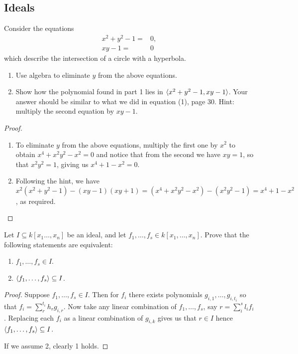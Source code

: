 \subsection{Ideals}


\begin{exercise}{1}
Consider the equations
\begin{align*}
    x^2+y^2-1 =& 0,\\
    xy-1 =& 0
\end{align*}
which describe the intersection of a circle with a hyperbola.
\begin{enumerate}
    \item Use algebra to eliminate $y$ from the above equations.
    \item Show how the polynomial found in part 1 lies in $\langle x^2+y^2-1, xy-1\rangle$. Your answer should be similar to what we did in equation (1), page 30. Hint: multiply the second equation by $xy-1$.
\end{enumerate}
\end{exercise}
\begin{proof}
\begin{enumerate}
    \item To eliminate $y$ from the above equations, multiply the first one by $x^2$ to obtain $x^4+x^2y^2-x^2=0$ and notice that from the second we have $xy=1$, so that $x^2y^2=1$, giving us $x^4+1-x^2=0$.
    \item Following the hint, we have $x^2(x^2+y^2-1)-(xy-1)(xy+1) =(x^4+x^2y^2-x^2)-(x^2y^2-1) =x^4+1-x^2$, as required.
\end{enumerate}
\end{proof}

\begin{exercise}{2}
Let $I\subseteq k[x_1\dots,x_n]$ be an ideal, and let $f_1,\dots,f_s\in k[x_1,\dots,x_n]$. Prove that the following statements are equivalent:
\begin{enumerate}
    \item $f_1,\dots,f_s\in I$.
    \item $\langle f_1,\dots,f_s\rangle\subseteq I$.
\end{enumerate}
\end{exercise}
\begin{proof}
Suppose $f_1,\dots,f_s\in I$. Then for $f_i$ there exists polynomials $g_{i,1},\dots,g_{i,t_i}$ so that $f_i=\sum_r^{t_i}h_rg_{i,r}$. Now take any linear combination of $f_1,\dots,f_s$, say $r=\sum_i^sl_if_i$. Replacing each $f_i$ as a linear combination of $g_{i,k}$ gives us that $r\in I$ hence $\langle f_1,\dots,f_s\rangle\subseteq I$. 

If we assume 2, clearly 1 holds.
\end{proof}

